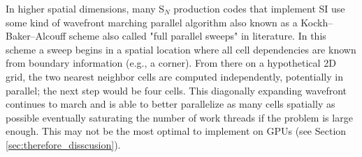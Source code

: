 In higher spatial dimensions, many S$_N$ production codes that implement SI use some kind of wavefront marching parallel algorithm also known as a Kockh--Baker--Alcouff scheme \cite{baker_kba_2017, colomer_parallel_2013} also called "full parallel sweeps" in literature.
In this scheme a sweep begins in a spatial location where all cell dependencies are known from boundary information (e.g., a corner).
From there on a hypothetical 2D grid, the two nearest neighbor cells are computed independently, potentially in parallel; the next step would be four cells.
This diagonally expanding wavefront continues to march and is able to better parallelize as many cells spatially as possible eventually saturating the number of work threads if the problem is large enough.
This may not be the most optimal to implement on GPUs (see Section \ref{sec:therefore_disscusion}).




